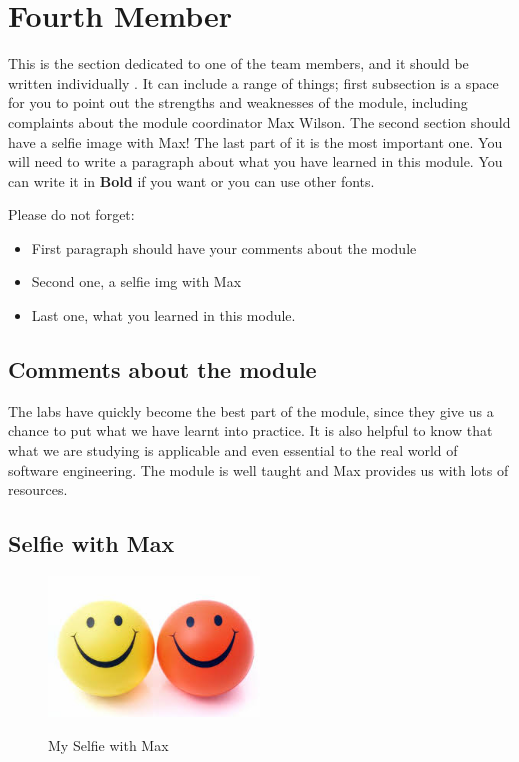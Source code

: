 \section{Fourth Member}
This is the section dedicated to one of the team members, and it should be written individually . It can include a range of things; first subsection is a space for you to point out the strengths and weaknesses of the module, including complaints about the module coordinator Max Wilson. The second section should have a selfie image with Max! The last part of it is the most important one. You will need to write a paragraph about what you have learned in this module. You can write it in \textbf{Bold} if you want or you can use other fonts. 

Please do not forget:
\begin{itemize}
	\item First paragraph should have your comments about the module
	\item Second one, a selfie img with Max
	\item Last one, what you learned in this module.
\end{itemize}

\subsection{Comments about the module}
The labs have quickly become the best part of the module, since they give us a chance to put what we have learnt into practice. It is also helpful to know that what we are studying is applicable and even essential to the real world of software engineering. 
The module is well taught and Max provides us with lots of resources.

\subsection{Selfie with Max}


\begin{figure}[h]
\caption{My Selfie with Max}
\centering
\includegraphics[width=0.5\textwidth]{Smiley-Faces}
\label{fig:selfie}
\end{figure}

